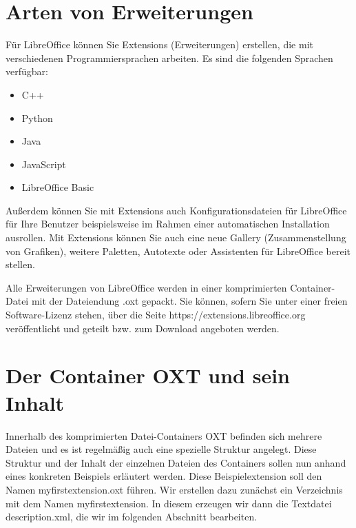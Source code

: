 \documentclass[a4paper,10pt,pagesize,titlepage]{scrbook}
\begin{document}
\chapter{Arten von Erweiterungen}
Für LibreOffice können Sie Extensions (Erweiterungen) erstellen, die mit verschiedenen Programmiersprachen arbeiten. Es sind die folgenden Sprachen verfügbar:
\begin{itemize}
	\item C++
	\item Python
	\item Java
	\item JavaScript
	\item LibreOffice Basic
\end{itemize}
Außerdem können Sie mit Extensions auch Konfigurationsdateien für LibreOffice für Ihre Benutzer beispielsweise im Rahmen einer automatischen Installation ausrollen. Mit Extensions können Sie auch eine neue Gallery (Zusammenstellung von Grafiken), weitere Paletten, Autotexte oder Assistenten für LibreOffice bereit stellen.

Alle Erweiterungen von LibreOffice werden in einer komprimierten Container-Datei mit der Dateiendung .oxt gepackt. Sie können, sofern Sie unter einer freien Software-Lizenz stehen, über die Seite https://extensions.libreoffice.org veröffentlicht und geteilt bzw. zum Download angeboten werden.

\chapter{Der Container OXT und sein Inhalt}\label{oxtcontainerinhalt}
Innerhalb des komprimierten Datei-Containers OXT befinden sich mehrere Dateien und es ist regelmäßig auch eine spezielle Struktur angelegt. Diese Struktur und der Inhalt der einzelnen Dateien des Containers sollen nun anhand eines konkreten Beispiels erläutert werden. Diese Beispielextension soll den Namen myfirstextension.oxt führen. Wir erstellen dazu zunächst ein Verzeichnis mit dem Namen myfirstextension. In diesem erzeugen wir dann die Textdatei description.xml, die wir im folgenden Abschnitt bearbeiten.
\end{document}
